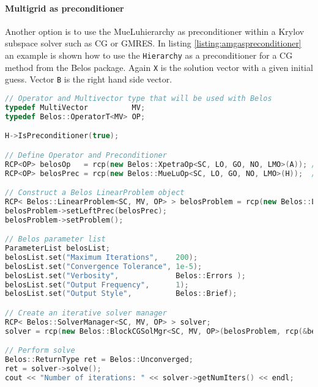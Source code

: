 \documentclass[12pt,a4paper]{article}
\newcommand{\MueLu}{MueLu}
\begin{document}
\paragraph{Multigrid as preconditioner}
Another option is to use the \MueLu hierarchy as preconditioner within a Krylov subspace solver such as CG or GMRES. In listing \ref{listing:amgaspreconditioner} an example is shown how to use the \verb|Hierarchy| as a preconditioner for a CG method from the Belos package.
Again \verb|X| is the solution vector with a given initial guess. Vector \verb|B| is the right hand side vector.
\begin{Listing} 
\begin{center} 
\begin{lstlisting}[language=C++,label=listing:AmgAsPreconditioner]
// Operator and Multivector type that will be used with Belos
typedef MultiVector          MV;
typedef Belos::OperatorT<MV> OP;

H->IsPreconditioner(true);

// Define Operator and Preconditioner
RCP<OP> belosOp   = rcp(new Belos::XpetraOp<SC, LO, GO, NO, LMO>(A)); // Turns a Xpetra::Matrix object into a Belos operator
RCP<OP> belosPrec = rcp(new Belos::MueLuOp<SC, LO, GO, NO, LMO>(H));  // Turns a MueLu::Hierarchy object into a Belos operator

// Construct a Belos LinearProblem object
RCP< Belos::LinearProblem<SC, MV, OP> > belosProblem = rcp(new Belos::LinearProblem<SC, MV, OP>(belosOp, X, B));
belosProblem->setLeftPrec(belosPrec);
belosProblem->setProblem();

// Belos parameter list
ParameterList belosList;
belosList.set("Maximum Iterations",    200); 
belosList.set("Convergence Tolerance", 1e-5);   
belosList.set("Verbosity",             Belos::Errors );
belosList.set("Output Frequency",      1);
belosList.set("Output Style",          Belos::Brief);

// Create an iterative solver manager
RCP< Belos::SolverManager<SC, MV, OP> > solver;
solver = rcp(new Belos::BlockCGSolMgr<SC, MV, OP>(belosProblem, rcp(&belosList, false)));

// Perform solve
Belos::ReturnType ret = Belos::Unconverged;
ret = solver->solve();
cout << "Number of iterations: " << solver->getNumIters() << endl;
\end{lstlisting}
\caption{Use AMG as preconditioner within Belos.} 
\label{listing:amgaspreconditioner}
\end{center}
\end{Listing}
\end{document}

